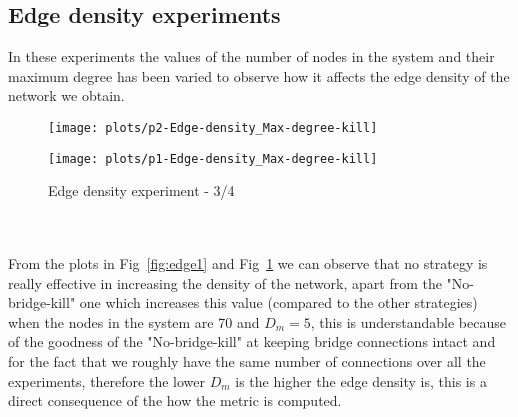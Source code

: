\documentclass{llncs}
\begin{document}
\subsection{Edge density experiments}
In these experiments the values of the number of nodes in the system and their maximum degree has been varied to observe how it affects the edge density of the network we obtain.
\begin{figure}[h!]
	\begin{minipage}{0.5\textwidth}
		\texttt{[image: plots/p2-Edge-density\_Max-degree-kill]}
		\caption{Edge density experiment - 1/2}
		\label{fig:edge1}
	\end{minipage}\hfill
	\begin{minipage}{0.5\textwidth}
		\centering
		\texttt{[image: plots/p1-Edge-density\_Max-degree-kill]}
		\caption{Edge density experiment - 3/4}
		\label{fig:edge2}
	\end{minipage}
\end{figure}
%
\\\\
From the plots in Fig~\ref{fig:edge1} and Fig~\ref{fig:edge2} we can observe that no strategy is really effective in increasing the density of the network, apart from the "No-bridge-kill" one which increases this value (compared to the other strategies) when the nodes in the system are 70 and $D_{m}=5$, this is understandable because of the goodness of the "No-bridge-kill" at keeping bridge connections intact and for the fact that we roughly have the same number of connections over all the experiments, therefore the lower $D_{m}$ is the higher the edge density is, this is a direct consequence of the how the metric is computed.
%
\end{document}
